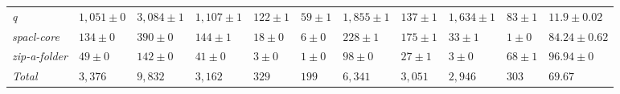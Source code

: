 \begin{table}
{\begin{tabular}[t]{lllllllllll}
\textit{q} & $1,051 \pm 0$ & $3,084 \pm 1$ & $1,107 \pm 1$ & $122 \pm 1$ & $59 \pm 1$ & $1,855 \pm 1$ & $137 \pm 1$ & $1,634 \pm 1$ & $83 \pm 1$ & $11.9 \pm 0.02$\\
\textit{spacl-core} & $134 \pm 0$ & $390 \pm 0$ & $144 \pm 1$ & $18 \pm 0$ & $6 \pm 0$ & $228 \pm 1$ & $175 \pm 1$ & $33 \pm 1$ & $1 \pm 0$ & $84.24 \pm 0.62$\\
\textit{zip-a-folder} & $49 \pm 0$ & $142 \pm 0$ & $41 \pm 0$ & $3 \pm 0$ & $1 \pm 0$ & $98 \pm 0$ & $27 \pm 1$ & $3 \pm 0$ & $68 \pm 1$ & $96.94 \pm 0$\\
\hline\textit{Total} & $3,376$ & $9,832$ & $3,162$ & $329$ & $199$ & $6,341$ & $3,051$ & $2,946$ & $303$ & $69.67$\\
\bottomrule
\end{tabular}}
\end{table}
